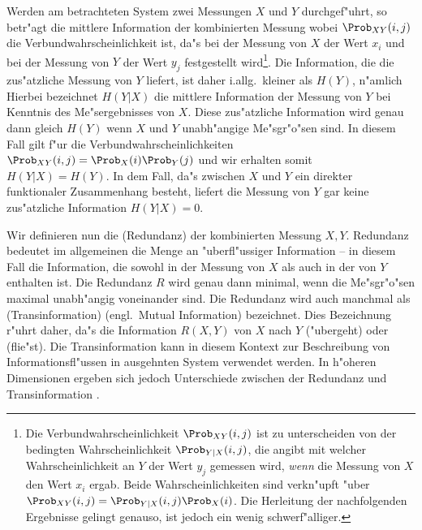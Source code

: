 Werden am betrachteten System zwei Messungen $X$ und $Y$ durchgef"uhrt, so betr"agt die
mittlere Information der kombinierten Messung  wobei $\Prob_{XY}(i,j)$ die Verbundwahrscheinlichkeit ist, da"s bei der
Messung von $X$ der Wert $x_i$ und bei der Messung von $Y$ der Wert $y_j$ festgestellt
wird\footnote{Die Verbundwahrscheinlichkeit $\Prob_{XY}(i,j)$ ist zu unterscheiden von der
  bedingten Wahrscheinlichkeit $\Prob_{Y|X}(i,j)$, die angibt mit welcher
  Wahrscheinlichkeit an $Y$ der Wert $y_j$ gemessen wird, \emph{wenn} die Messung von $X$
  den Wert $x_i$ ergab. Beide Wahrscheinlichkeiten sind verkn"upft "uber
  $\Prob_{XY}(i,j)=\Prob_{Y|X}(i,j)\Prob_X(i)$. Die Herleitung der nachfolgenden
  Ergebnisse gelingt genauso, ist jedoch ein wenig schwerf"alliger.}.  Die Information,
die die zus"atzliche Messung von $Y$ liefert, ist daher i.allg.\ kleiner als $H(Y)$,
n"amlich  Hierbei bezeichnet $H(Y|X)$ die mittlere Information der
Messung von $Y$ bei Kenntnis des Me"sergebnisses von $X$. Diese zus"atzliche Information
wird genau dann gleich $H(Y)$ wenn $X$ und $Y$ unabh"angige Me"sgr"o"sen sind. In diesem
Fall gilt f"ur die Verbundwahrscheinlichkeiten $\Prob_{XY}(i,j)=\Prob_X(i)\Prob_Y(j)$ und
wir erhalten
 somit $H(Y|X)=H(Y)$. In dem Fall, da"s zwischen $X$ und $Y$ ein direkter
funktionaler Zusammenhang besteht, liefert die Messung von $Y$ gar keine zus"atzliche
Information $H(Y|X)=0$.

Wir definieren nun die \begriff(Redundanz) der kombinierten Messung $X,Y$. Redundanz
bedeutet im allgemeinen die Menge an "uberfl"ussiger Information -- in diesem Fall die
Information, die sowohl in der Messung von $X$ als auch in der von $Y$ enthalten ist.
 Die Redundanz $R$ wird genau dann minimal,
wenn die Me"sgr"o"sen maximal unabh"angig voneinander sind. Die Redundanz wird auch
manchmal als \begriff(Transinformation) (engl.\ Mutual Information) bezeichnet. Dies
Bezeichnung r"uhrt daher, da"s die Information $R(X,Y)$ von $X$ nach $Y$ \slang("ubergeht)
oder \slang(flie"st). Die Transinformation kann in diesem Kontext zur Beschreibung von
Informationsfl"ussen in ausgehnten System verwendet werden\cite{Pawelzik91}.  In h"oheren
Dimensionen ergeben sich jedoch Unterschiede zwischen der Redundanz und Transinformation
\cite{Prichard95}.




